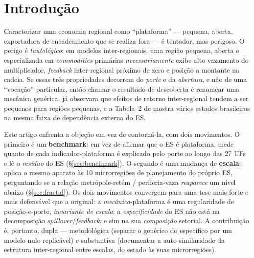 \documentclass[11pt,a4paper]{article}
\begin{document}
\section{Introdução}
\label{sec:intro}
Caracterizar uma economia regional como ``plataforma'' --- pequena, aberta,
exportadora de encadeamento que se realiza fora --- é tentador, mas perigoso.
O perigo é \emph{tautológico}: em modelos inter-regionais, uma região pequena,
aberta e especializada em \emph{commodities} primárias \emph{necessariamente}
exibe alto vazamento do multiplicador, \emph{feedback} inter-regional próximo de
zero e posição a montante na cadeia. Se essas três propriedades decorrem do
\emph{porte} e da \emph{abertura}, e não de uma ``vocação'' particular, então
chamar o resultado de descoberta é renomear uma mecânica genérica. \citet{miller1966}
já observara que efeitos de retorno inter-regional tendem a ser pequenos para
regiões pequenas, e a Tabela~2 de \citet{haddad2017iioas} mostra vários estados
brasileiros na mesma faixa de dependência externa do ES.

Este artigo enfrenta a objeção em vez de contorná-la, com dois movimentos. O
primeiro é um \textbf{benchmark}: em vez de afirmar que o ES é plataforma, mede
quanto de cada indicador-plataforma é explicado pelo porte ao longo das 27 UFs e
lê o \emph{resíduo} do ES (\S\ref{sec:benchmark}). O segundo é uma mudança de
\textbf{escala}: aplica o mesmo aparato às 10 microrregiões de planejamento do
próprio ES, perguntando se a relação metrópole-retém / periferia-vaza
\emph{reaparece} um nível abaixo (\S\ref{sec:fractal}). Os dois movimentos
convergem para uma tese mais forte e mais defensável que a original: a
\emph{mecânica}-plataforma é uma regularidade de posição-e-porte, \emph{invariante
de escala}; a \emph{especificidade} do ES não está na decomposição
\emph{spillover}/\emph{feedback}, e sim na sua \emph{composição} setorial. A
contribuição é, portanto, dupla --- metodológica (separar o genérico do
específico por um modelo nulo replicável) e substantiva (documentar a
auto-similaridade da estrutura inter-regional entre escalas, do estado às suas
microrregiões).

\end{document}
